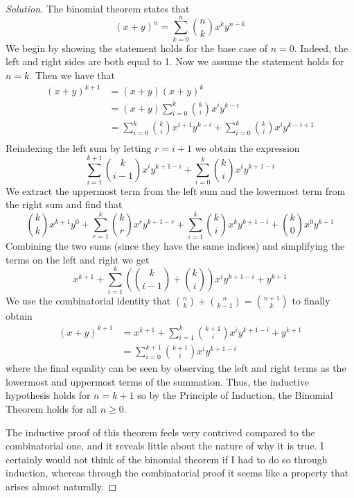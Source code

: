 \documentclass[12pt]{article}
\theoremstyle{definition}
\newenvironment{solution}{
  \begin{proof}[Solution]
    \vspace{-8px}
    \setlength{\parskip}{4px}
    \setlength{\parindent}{0px}
}{
\end{proof}
}
\begin{document}
  \begin{solution}
    The binomial theorem states that
    \[(x+y)^{n} = \sum_{k=0}^{n} {n \choose k} x^{k}y^{n-k}\]
    We begin by showing the statement holds for the base case of \(n=0\). Indeed, the left and right sides are both equal to 1. Now we assume the statement holds for \(n=k\). Then we have that
    \[
    \begin{split}
      (x+y)^{k+1} & = (x+y) (x+y)^{k} \\
      & = (x+y) \sum_{i=0}^{k} {k \choose i} x^{i}y^{k-i} \\
      & = \sum_{i=0}^{k} {k \choose i} x^{i+1}y^{k-i} + \sum_{i=0}^{k} {k \choose i} x^{i}y^{k-i+1} \\
    \end{split}
    \]
    Reindexing the left sum by letting \(r = i + 1\) we obtain the expression
    \[
      \sum_{i=1}^{k+1} {k \choose i-1} x^{i}y^{k+1-i} + \sum_{i=0}^{k} {k \choose i} x^{i}y^{k+1-i}
    \]
    We extract the uppermost term from the left sum and the lowermost term from the right sum and find that
    \[
      {k \choose k} x^{k+1}y^{0} + \sum_{r=1}^{k} {k \choose r} x^{r}y^{k+1-r} + \sum_{i=1}^{k} {k \choose i} x^{k}y^{k+1-i} + {k \choose 0} x^{0}y^{k+1}
    \]
    Combining the two sums (since they have the same indices) and simplifying the terms on the left and right we get
    \[
      x^{k+1} + \sum_{i=1}^{k} \left( {k \choose i-1} + {k \choose i} \right) x^{i}y^{k+1-i} + y^{k+1}
    \]
    We use the combinatorial identity that \({n \choose k} + {n \choose k-1} = {n+1 \choose k}\) to finally obtain
    \[
    \begin{split}
      (x+y)^{k+1} & = x^{k+1} + \sum_{i=1}^{k} {k+1 \choose i} x^{i}y^{k+1-i} + y^{k+1} \\
      & = \sum_{i=0}^{k+1} {k+1 \choose i} x^{i}y^{k+1-i}
    \end{split}
    \]
    where the final equality can be seen by observing the left and right terms as the lowermost and uppermost terms of the summation. Thus, the inductive hypothesis holds for \(n=k+1\) so by the Principle of Induction, the Binomial Theorem holds for all \(n \geq 0\). \qedhere


    The inductive proof of this theorem feels very contrived compared to the combinatorial one, and it reveals little about the nature of why it is true. I certainly would not think of the binomial theorem if I had to do so through induction, whereas through the combinatorial proof it seems like a property that arises almost naturally.
  \end{solution}
\end{document}
